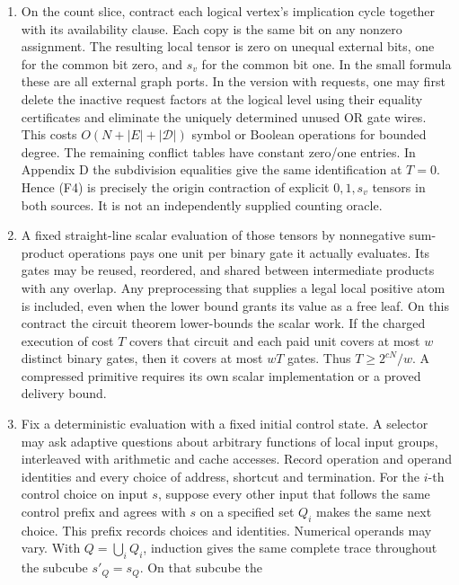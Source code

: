 \documentclass[11pt,a4paper]{article}
\providecommand{\tightlist}{\setlength{\itemsep}{0pt}\setlength{\parskip}{0pt}}
\begin{document}
\begin{enumerate}
\def\labelenumi{\arabic{enumi}.}
\tightlist
\item
  On the count slice, contract each logical vertex's implication cycle
  together with its availability clause. Each copy is the same bit on
  any nonzero assignment. The resulting local tensor is zero on unequal
  external bits, one for the common bit zero, and \(s_v\) for the common
  bit one. In the small formula these are all external graph ports. In
  the version with requests, one may first delete the inactive request
  factors at the logical level using their equality certificates and
  eliminate the uniquely determined unused OR gate wires. This costs
  \(O(N+|E|+|\mathcal D|)\) symbol or Boolean operations for bounded
  degree. The remaining conflict tables have constant zero/one entries.
  In Appendix D the subdivision equalities give the same identification
  at \(T=0\). Hence (F4) is precisely the origin contraction of explicit
  \(0,1,s_v\) tensors in both sources. It is not an independently
  supplied counting oracle.
\item
  A fixed straight-line scalar evaluation of those tensors by
  nonnegative sum-product operations pays one unit per binary gate it
  actually evaluates. Its gates may be reused, reordered, and shared
  between intermediate products with any overlap. Any preprocessing that
  supplies a legal local positive atom is included, even when the lower
  bound grants its value as a free leaf. On this contract the circuit
  theorem lower-bounds the scalar work. If the charged execution of cost
  \(T\) covers that circuit and each paid unit covers at most \(w\)
  distinct binary gates, then it covers at most \(wT\) gates. Thus
  \(T\ge2^{cN}/w\). A compressed primitive requires its own scalar
  implementation or a proved delivery bound.
\item
  Fix a deterministic evaluation with a fixed initial control state. A
  selector may ask adaptive questions about arbitrary functions of local
  input groups, interleaved with arithmetic and cache accesses. Record
  operation and operand identities and every choice of address, shortcut
  and termination. For the \(i\)-th control choice on input \(s\),
  suppose every other input that follows the same control prefix and
  agrees with \(s\) on a specified set \(Q_i\) makes the same next
  choice. This prefix records choices and identities. Numerical operands
  may vary. With \(Q=\bigcup_i Q_i\), induction gives the same complete
  trace throughout the subcube \(s'_Q=s_Q\). On that subcube the

\end{enumerate}
\end{document}

